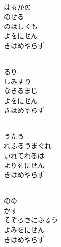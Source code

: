 \documentclass[10pt,b5j]{tarticle} %
\begin{document}
\vspace{1.5em} %
\newcommand{\linespace}{0.5em} %
\newcommand{\blocksize}{0.5\hsize} %
\newcommand{\itemmargin}{6em} %
\begin{enumerate} %
    \setlength{\itemindent}{\itemmargin} %
    \begin{minipage}[c]{\blocksize}
    
        \vspace{\linespace}
        \item~\\
        はるかの\\
        のせる\\
        のはしくも\\
        よをにせん\\
        きはめやらず
        
        \vspace{\linespace}
        \item~\\
        るり\\
        しみすり\\
        なきるまじ\\
        よをにせん\\
        きはめやらず
        
        \vspace{\linespace}
        \item~\\
        うたう\\
        れふるうまぐれ\\
        いれてれるは\\
        よりをにせん\\
        きはめやらず
        
        \vspace{\linespace}
        \item~\\
        のの\\
        かす\\
        そぞろきにふるう\\
        よみをにせん\\
        きはめやらず
    
    \end{minipage}
\end{enumerate} %
\end{document}
